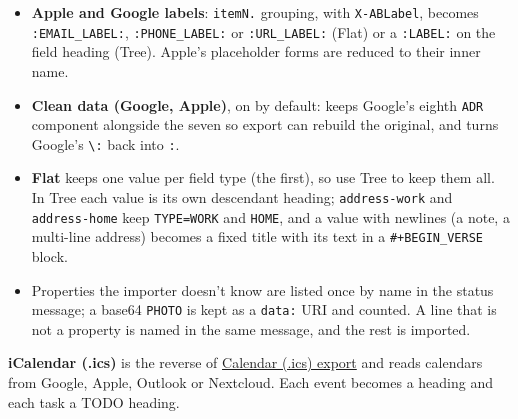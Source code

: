 \documentclass[11pt]{article}
\begin{document}
\begin{itemize}
\item \textbf{Apple and Google labels}: \texttt{itemN.} grouping, with \texttt{X-ABLabel}, becomes \texttt{:EMAIL\_LABEL:}, \texttt{:PHONE\_LABEL:} or \texttt{:URL\_LABEL:} (Flat) or a \texttt{:LABEL:} on the field heading (Tree). Apple's placeholder forms are reduced to their inner name.
\item \textbf{Clean data (Google, Apple)}, on by default: keeps Google's eighth \texttt{ADR} component alongside the seven so export can rebuild the original, and turns Google's \texttt{\textbackslash{}:} back into \texttt{:}.
\item \textbf{Flat} keeps one value per field type (the first), so use Tree to keep them all. In Tree each value is its own descendant heading; \texttt{address-work} and \texttt{address-home} keep \texttt{TYPE=WORK} and \texttt{HOME}, and a value with newlines (a note, a multi-line address) becomes a fixed title with its text in a \texttt{\#+BEGIN\_VERSE} block.
\item Properties the importer doesn't know are listed once by name in the status message; a base64 \texttt{PHOTO} is kept as a \texttt{data:} URI and counted. A line that is not a property is named in the same message, and the rest is imported.
\end{itemize}

\textbf{iCalendar (.ics)} is the reverse of \hyperref[sec:org9a53e51]{Calendar (.ics) export} and reads calendars from Google, Apple, Outlook or Nextcloud. Each event becomes a heading and each task a TODO heading.
\end{document}

